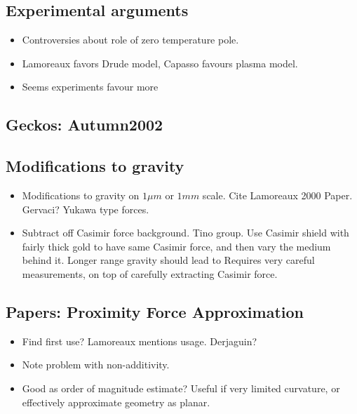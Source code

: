 \cite{Sukenik1993}

\subsection{Experimental arguments}

\begin{itemize}
\item Controversies about role of zero temperature pole.  
\item Lamoreaux favors Drude model, Capasso favours plasma model.
\item Seems experiments favour more 
\end{itemize}

\subsection{Geckos: Autumn2002}
\cite{Autumn2002}

\cite{Hawkes2014}

\subsection{Modifications to gravity}

\begin{itemize}
\item Modifications to gravity on $1\mu m$ or $1mm$ scale.  Cite Lamoreaux 2000 Paper.  Gervaci?
Yukawa type forces.  
\item Subtract off Casimir force background.  Tino group.  Use Casimir shield with fairly thick gold to have same Casimir force, and then vary the medium behind it.  Longer range gravity should lead to Requires very careful measurements, on top of carefully extracting Casimir force.   
\end{itemize}

\subsection{Papers: Proximity Force Approximation}

\begin{itemize}
\item Find first use?  Lamoreaux mentions usage.  Derjaguin?\cite{Derjaguin1956} \cite{Blocki1977}
\item Note problem with non-additivity. 
\item Good as order of magnitude estimate?  Useful if very limited curvature, or effectively approximate geometry as planar.  
\end{itemize}

